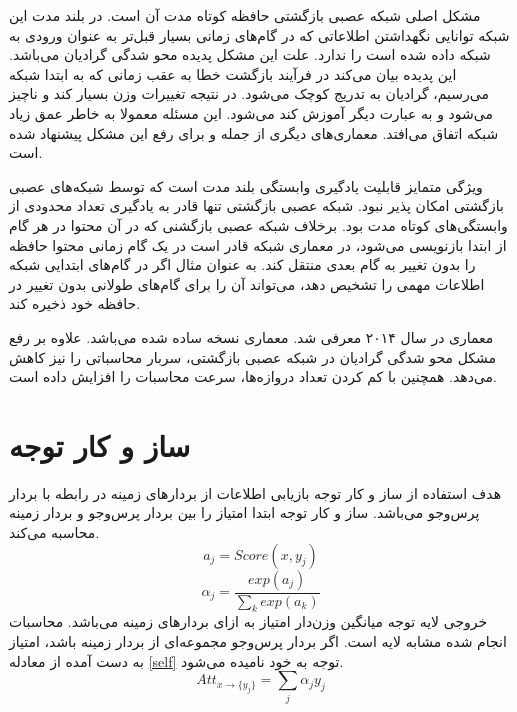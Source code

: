 مشکل اصلی شبکە عصبی بازگشتی حافظه کوتاه مدت آن است. در بلند مدت این شبکه توانایی نگهداشتن اطلاعاتی که در گام‌های زمانی بسیار قبل‌تر به عنوان ورودی به شبکه داده شدە است را ندارد. علت این مشکل پدیده محو شدگی گرادیان
می‌باشد. این پدیده بیان می‌کند در فرآیند بازگشت خطا به عقب
زمانی که به ابتدا شبکه می‌رسیم، گرادیان به تدریج کوچک می‌شود. در نتیجه تغییرات وزن بسیار کند و ناچیز می‌شود و
به عبارت دیگر آموزش کند می‌شود. این مسئله معمولا به خاطر عمق زیاد شبکه اتفاق می‌افتد. معماری‌های دیگری از جمله   
\cite{6795963}
و  
\cite{69e088c8129341ac89810907fe6b1bfe}
برای رفع این مشکل پیشنهاد شده است. 

ویژگی متمایز 
 قابلیت یادگیری وابستگی بلند مدت است که توسط شبکە‌های عصبی بازگشتی امکان پذیر نبود. شبکه عصبی بازگشتی تنها قادر به یادگیری تعداد محدودی از وابستگی‌های کوتاه مدت بود. برخلاف شبکه عصبی بازگشنی که در آن محتوا در هر گام از ابتدا بازنویسی می‌شود، در معماری  شبکه قادر است در یک گام زمانی محتوا حافظه را بدون تغییر به گام بعدی منتقل کند. به عنوان مثال اگر در گام‌های ابتدایی شبکه اطلاعات مهمی را تشخیص دهد، می‌تواند آن را برای گام‌های طولانی بدون تغییر در حافظه خود ذخیره کند.

معماری  
در سال ۲۰۱۴ معرفی شد. معماری  نسخه ساده شده  می‌باشد.  علاوه بر رفع مشکل محو شدگی گرادیان در شبکە عصبی بازگشتی، سربار محاسباتی  را نیز کاهش می‌دهد. همچنین با کم کردن تعداد دروازە‌ها، سرعت محاسبات را افزایش داده است.
\section{ساز و کار توجه
}\label{attention}
هدف استفاده از ساز و کار توجه
بازیابی اطلاعات از بردارهای زمینه
در رابطه با بردار پرس‌وجو
می‌باشد. ساز و کار توجه ابتدا امتیاز 
را بین بردار پرس‌وجو 
و بردار زمینه
محاسبه می‌کند.
\begin{equation}
	a_j = Score(x, y_j)
\end{equation}
\begin{equation}
	\alpha_j = \frac{exp(a_j)}{\sum_{k} exp(a_k)}
\end{equation}
خروجی لایه توجه میانگین وزن‌دار امتیاز 
به ازای بردار‌های زمینه می‌باشد. محاسبات انجام شده مشابه لایه 
است. اگر بردار پرس‌وجو
مجموعه‌ای از بردار زمینه
باشد، امتیاز به دست آمده از معادله
\ref{self}
توجه به خود
نامیده می‌شود.
\begin{equation}\label{self}
	Att_{x \to \{y_j\}} = \sum_{j} \alpha_jy_j
\end{equation}


